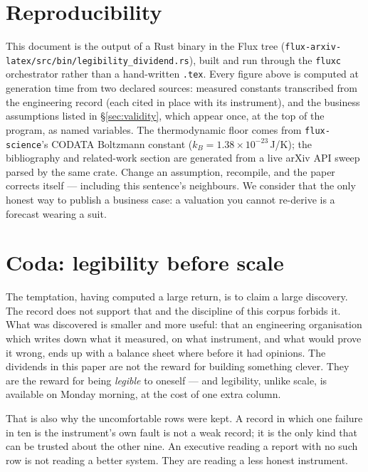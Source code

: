\documentclass[11pt,a4paper]{article}
\begin{document}
\section{Reproducibility}
This document is the output of a Rust binary in the Flux tree (\texttt{flux-arxiv-latex/}\allowbreak\texttt{src/bin/}\allowbreak\texttt{legibility\_dividend.rs}), built and run through the \texttt{fluxc} orchestrator rather than a hand-written \texttt{.tex}. Every figure above is computed at generation time from two declared sources: measured constants transcribed from the engineering record (each cited in place with its instrument), and the business assumptions listed in \S\ref{sec:validity}, which appear once, at the top of the program, as named variables. The thermodynamic floor comes from \texttt{flux-science}'s CODATA Boltzmann constant ($k_B=1.38\times10^{-23}$\,J/K); the bibliography and related-work section are generated from a live arXiv API sweep parsed by the same crate. Change an assumption, recompile, and the paper corrects itself --- including this sentence's neighbours. We consider that the only honest way to publish a business case: a valuation you cannot re-derive is a forecast wearing a suit.


\section{Coda: legibility before scale}
The temptation, having computed a large return, is to claim a large discovery. The record does not support that and the discipline of this corpus forbids it. What was discovered is smaller and more useful: that an engineering organisation which writes down what it measured, on what instrument, and what would prove it wrong, ends up with a balance sheet where before it had opinions. The dividends in this paper are not the reward for building something clever. They are the reward for being \emph{legible} to oneself --- and legibility, unlike scale, is available on Monday morning, at the cost of one extra column.


That is also why the uncomfortable rows were kept. A record in which one failure in ten is the instrument's own fault is not a weak record; it is the only kind that can be trusted about the other nine. An executive reading a report with no such row is not reading a better system. They are reading a less honest instrument.
\end{document}
